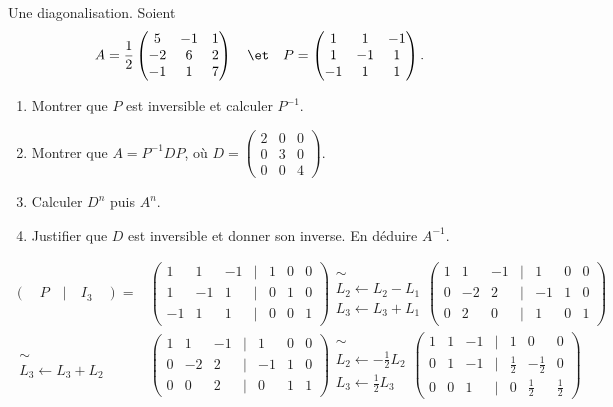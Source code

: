 \documentclass[11pt]{article}
\begin{document}
\begin{ex}{Une diagonalisation.}{}
    Soient
    \begin{equation*}
        A=\frac{1}{2}\begin{pmatrix}5&-1&1\\-2&6&2\\-1&1&7\end{pmatrix} \quad\et\quad P=\begin{pmatrix}1&1&-1\\1&-1&1\\-1&1&1\end{pmatrix}.
    \end{equation*}
    \begin{enumerate}
        \item Montrer que $P$ est inversible et calculer $P^{-1}$.
        \item Montrer que $A=P^{-1}DP$, où \small$D=\begin{pmatrix}2&0&0\\0&3&0\\0&0&4\end{pmatrix}$\normalsize.
        \item Calculer $D^n$ puis $A^n$.
        \item Justifier que $D$ est inversible et donner son inverse. En déduire $A^{-1}$.
    \end{enumerate}
    \tcblower
    \begin{align*}
        \left(\quad P \quad \Biggr| \quad I_3 \quad \right) =& \begin{pmatrix}1&1&-1&|&1&0&0\\1&-1&1&|&0&1&0\\-1&1&1&|&0&0&1\end{pmatrix} \substack{\sim\\L_2\gets L_2-L_1\\L_3\gets L_3+L_1} \begin{pmatrix}1&1&-1&|&1&0&0\\0&-2&2&|&-1&1&0\\0&2&0&|&1&0&1\end{pmatrix}\\
        \substack{\sim\\ L_3\gets L_3+L_2}&\begin{pmatrix}1&1&-1&|&1&0&0\\0&-2&2&|&-1&1&0\\0&0&2&|&0&1&1\end{pmatrix}\substack{\sim\\ L_2\gets -\frac{1}{2}L_2\\ L_3\gets\frac{1}{2}L_3}\begin{pmatrix}1&1&-1&|&1&0&0\\0&1&-1&|&\frac{1}{2}&-\frac{1}{2}&0\\0&0&1&|&0&\frac{1}{2}&\frac{1}{2}\end{pmatrix}\\

\end{align*}
\end{ex}
\end{document}
